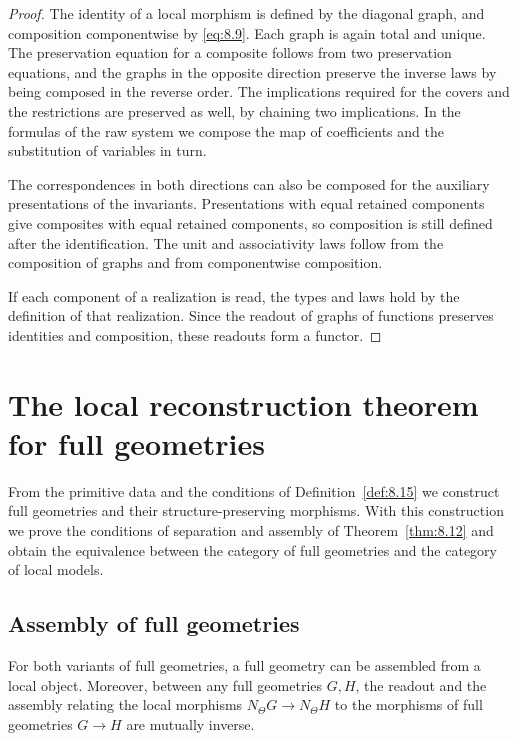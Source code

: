 \begin{proof}

The identity of a local morphism is defined by the diagonal graph, and composition
componentwise by \eqref{eq:8.9}.
Each graph is again total and unique.
The preservation equation for a composite follows from two preservation equations, and the
graphs in the opposite direction preserve the inverse laws by being composed in the reverse
order.
The implications required for the covers and the restrictions are preserved as well, by
chaining two implications.
In the formulas of the raw system we compose the map of coefficients and the substitution of
variables in turn.

The correspondences in both directions can also be composed for the auxiliary presentations
of the invariants.
Presentations with equal retained components give composites with equal retained components,
so composition is still defined after the identification.
The unit and associativity laws follow from the composition of graphs and from componentwise
composition.

If each component of a realization is read, the types and laws hold by the definition of that
realization.
Since the readout of graphs of functions preserves identities and composition, these readouts
form a functor.

\end{proof}

\section{The local reconstruction theorem for full geometries}\label{sec:8.5}

From the primitive data and the conditions of Definition~\ref{def:8.15} we construct full
geometries and their structure-preserving morphisms.
With this construction we prove the conditions of separation and assembly of
Theorem~\ref{thm:8.12} and obtain the equivalence between the category of full geometries and
the category of local models.

\subsection*{Assembly of full geometries}

\begin{lemma}\label{lem:8.17}

For both variants of full geometries, a full geometry can be assembled from a local object.
Moreover, between any full geometries $G,H$, the readout and the assembly relating the local
morphisms $N_\Theta G\to N_\Theta H$ to the morphisms of full geometries $G\to H$ are
mutually inverse.

\end{lemma}

